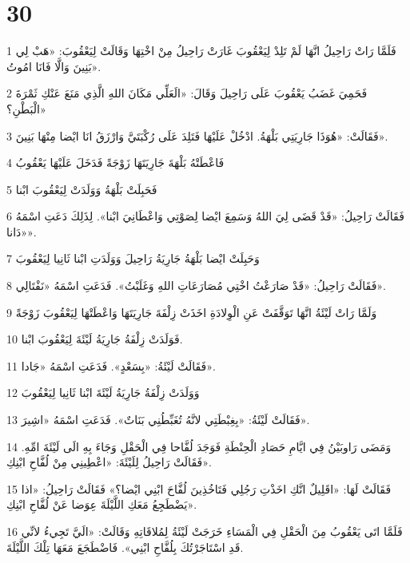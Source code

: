 \chapter{30}

\par 1 فَلَمَّا رَاتْ رَاحِيلُ انَّهَا لَمْ تَلِدْ لِيَعْقُوبَ غَارَتْ رَاحِيلُ مِنْ اخْتِهَا وَقَالَتْ لِيَعْقُوبَ: «هَبْ لِي بَنِينَ وَالَّا فَانَا امُوتُ».
\par 2 فَحَمِيَ غَضَبُ يَعْقُوبَ عَلَى رَاحِيلَ وَقَالَ: «الَعَلِّي مَكَانَ اللهِ الَّذِي مَنَعَ عَنْكِ ثَمْرَةَ الْبَطْنِ؟»
\par 3 فَقَالَتْ: «هُوَذَا جَارِيَتِي بَلْهَةُ. ادْخُلْ عَلَيْهَا فَتَلِدَ عَلَى رُكْبَتَيَّ وَارْزَقُ انَا ايْضا مِنْهَا بَنِينَ».
\par 4 فَاعْطَتْهُ بَلْهَةَ جَارِيَتَهَا زَوْجَةً فَدَخَلَ عَلَيْهَا يَعْقُوبُ
\par 5 فَحَبِلَتْ بَلْهَةُ وَوَلَدَتْ لِيَعْقُوبَ ابْنا
\par 6 فَقَالَتْ رَاحِيلُ: «قَدْ قَضَى لِيَ اللهُ وَسَمِعَ ايْضا لِصَوْتِي وَاعْطَانِيَ ابْنا». لِذَلِكَ دَعَتِ اسْمَهُ «دَانا».
\par 7 وَحَبِلَتْ ايْضا بَلْهَةُ جَارِيَةُ رَاحِيلَ وَوَلَدَتِ ابْنا ثَانِيا لِيَعْقُوبَ
\par 8 فَقَالَتْ رَاحِيلُ: «قَدْ صَارَعْتُ اخْتِي مُصَارَعَاتِ اللهِ وَغَلَبْتُ». فَدَعَتِ اسْمَهُ «نَفْتَالِي».
\par 9 وَلَمَّا رَاتْ لَيْئَةُ انَّهَا تَوَقَّفَتْ عَنِ الْوِلادَةِ اخَذَتْ زِلْفَةَ جَارِيَتَهَا وَاعْطَتْهَا لِيَعْقُوبَ زَوْجَةً
\par 10 فَوَلَدَتْ زِلْفَةُ جَارِيَةُ لَيْئَةَ لِيَعْقُوبَ ابْنا.
\par 11 فَقَالَتْ لَيْئَةُ: «بِسَعْدٍ». فَدَعَتِ اسْمَهُ «جَادا».
\par 12 وَوَلَدَتْ زِلْفَةُ جَارِيَةُ لَيْئَةَ ابْنا ثَانِيا لِيَعْقُوبَ
\par 13 فَقَالَتْ لَيْئَةُ: «بِغِبْطَتِي لانَّهُ تُغَبِّطُنِي بَنَاتٌ». فَدَعَتِ اسْمَهُ «اشِيرَ».
\par 14 وَمَضَى رَاوبَيْنُ فِي ايَّامِ حَصَادِ الْحِنْطَةِ فَوَجَدَ لُفَّاحا فِي الْحَقْلِ وَجَاءَ بِهِ الَى لَيْئَةَ امِّهِ. فَقَالَتْ رَاحِيلُ لِلَيْئَةَ: «اعْطِينِي مِنْ لُفَّاحِ ابْنِكِ».
\par 15 فَقَالَتْ لَهَا: «اقَلِيلٌ انَّكِ اخَذْتِ رَجُلِي فَتَاخُذِينَ لُفَّاحَ ابْنِي ايْضا؟» فَقَالَتْ رَاحِيلُ: «اذا يَضْطَجِعُ مَعَكِ اللَّيْلَةَ عِوَضا عَنْ لُفَّاحِ ابْنِكِ».
\par 16 فَلَمَّا اتَى يَعْقُوبُ مِنَ الْحَقْلِ فِي الْمَسَاءِ خَرَجَتْ لَيْئَةُ لِمُلاقَاتِهِ وَقَالَتْ: «الَيَّ تَجِيءُ لانِّي قَدِ اسْتَاجَرْتُكَ بِلُفَّاحِ ابْنِي». فَاضْطَجَعَ مَعَهَا تِلْكَ اللَّيْلَةَ.
